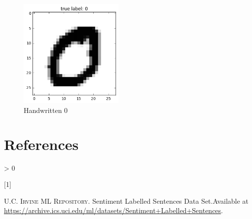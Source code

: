 \documentclass[
]{article}
\newlength{\cslhangindent}
\newlength{\csllabelwidth}
\newenvironment{CSLReferences}[3] %
 {%
  \setlength{\parindent}{0pt}
  \ifodd #1 \everypar{\setlength{\hangindent}{\cslhangindent}}\ignorespaces\fi
  \ifnum #2 > 0
  \setlength{\parskip}{#3\baselineskip}
  \fi
 }%
 {}
\newcommand{\CSLLeftMargin}[1]{\parbox[t]{\maxof{\widthof{#1}}{\csllabelwidth}}{#1}}
\newcommand{\CSLRightInline}[1]{\parbox[t]{\linewidth}{#1}}
\begin{document}
\begin{figure}
\hypertarget{fig:mnist0}{%
\centering
\includegraphics[width=2in,height=\textheight]{../img/mnist_data_10_0.png}
\caption{Handwritten 0}\label{fig:mnist0}
}
\end{figure}

\hypertarget{bibliography}{%
\section*{References}\label{bibliography}}

\hypertarget{refs}{}
\begin{CSLReferences}{0}{0}
\leavevmode\hypertarget{ref-sentences}{}%
\CSLLeftMargin{{[}1{]} }
\CSLRightInline{\textsc{U.C. Irvine ML Repository}. {Sentiment Labelled
Sentences Data Set}.Available at
\url{https://archive.ics.uci.edu/ml/datasets/Sentiment+Labelled+Sentences}.}

\end{CSLReferences}
\end{document}
